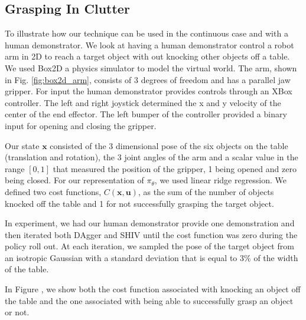 \documentclass[10pt, conference]{ieeeconf}      %
\newcommand{\bu}{\mathbf{u}}
\newcommand{\bx}{\mathbf{x}}
\begin{document}
\subsection{Grasping In Clutter}
To illustrate how our technique can be used in the continuous case and with a human demonstrator. 
We look at having a human demonstrator control a robot arm in 2D to reach a target object with out knocking other objects off a table. We used Box2D a physics simulator to model the virtual world. The arm, shown in Fig. \ref{fig:box2d_arm}, consists of 3 degrees of freedom and has a parallel jaw gripper. For input the human demonstrator provides controls through an XBox controller. The left and right joystick determined the x and y velocity of the center of the end effector. The left bumper of the controller provided a binary input for opening and closing the gripper. 

Our state $\bx$ consisted of the 3 dimensional pose of the six objects on the table (translation and rotation), the 3 joint angles of the arm and a scalar value in the range $[0,1]$ that measured the position of the gripper, 1 being opened and zero being closed. For our representation of $\pi_{\theta}$, we used linear ridge regression. We defined two cost functions, $C(\bx,\bu)$, as the sum of the number of objects knocked off the table and 1 for not successfully grasping the target object. 

In experiment, we had our human demonstrator provide one demonstration and then iterated both  DAgger and SHIV until the cost function was zero during the policy roll out. At each iteration, we sampled the pose of the target object from an isotropic Gaussian with a standard deviation that is equal to $3\%$ of the width of the table. 

In Figure , we show both the cost function associated with knocking an object off the table and the one associated with being able to successfully grasp an object or not. 
\end{document}
